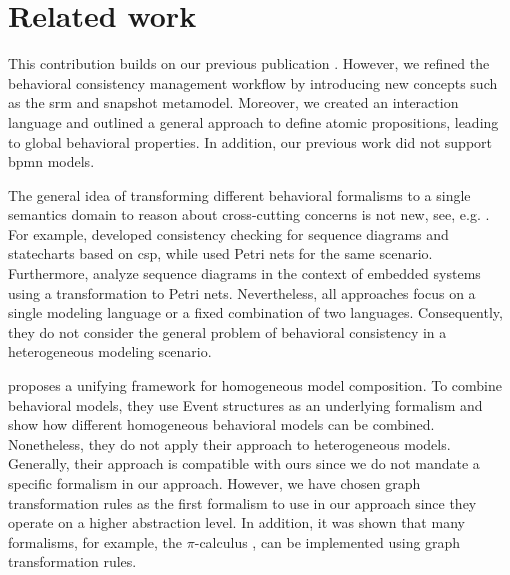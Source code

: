 \documentclass{jot}
\begin{document}
\section{Related work} \label{sec:related_work}
This contribution builds on our previous publication \cite{krauterBehavioralConsistencyHeterogeneous2021}.
However, we refined the behavioral consistency management workflow by introducing new concepts such as the \gls*{srm} and snapshot metamodel.
Moreover, we created an interaction language and outlined a general approach to define atomic propositions, leading to global behavioral properties.
In addition, our previous work did not support \gls*{bpmn} models.

The general idea of transforming different behavioral formalisms to a single semantics domain to reason about cross-cutting concerns is not new, see, e.g. \cite{engelsMethodologySpecifyingAnalyzing2001}.
For example, \cite{kusterExplicitBehavioralConsistency2003} developed consistency checking for sequence diagrams and statecharts based on \gls*{csp}, while \cite{yaoConsistencyCheckingUML2006} used Petri nets for the same scenario.
Furthermore, \cite{cunhaFormalVerificationUML2011} analyze sequence diagrams in the context of embedded systems using a transformation to Petri nets.
Nevertheless, all approaches focus on a single modeling language or a fixed combination of two languages.
Consequently, they do not consider the general problem of behavioral consistency in a heterogeneous modeling scenario.

\cite{kienzleUnifyingFrameworkHomogeneous2019} proposes a unifying framework for homogeneous model composition.
To combine behavioral models, they use Event structures \cite{winskelEventStructures1987} as an underlying formalism and show how different homogeneous behavioral models can be combined.
Nonetheless, they do not apply their approach to heterogeneous models.
Generally, their approach is compatible with ours since we do not mandate a specific formalism in our approach.
However, we have chosen graph transformation rules as the first formalism to use in our approach since they operate on a higher abstraction level.
In addition, it was shown that many formalisms, for example, the $\pi$-calculus \cite{gadducciGraphRewritingPcalculus2007}, can be implemented using graph transformation rules.
\end{document}
